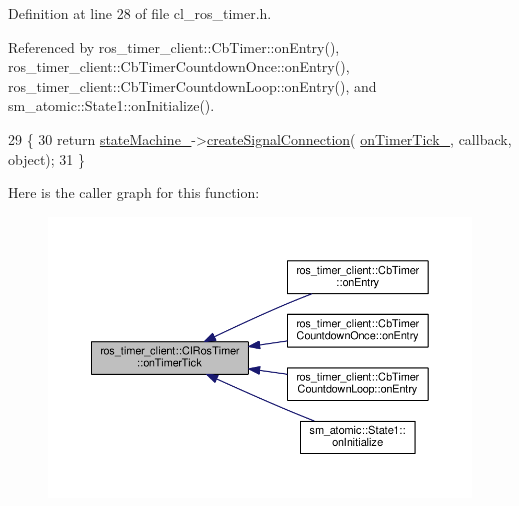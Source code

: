 Definition at line 28 of file cl\+\_\+ros\+\_\+timer.\+h.



Referenced by ros\+\_\+timer\+\_\+client\+::\+Cb\+Timer\+::on\+Entry(), ros\+\_\+timer\+\_\+client\+::\+Cb\+Timer\+Countdown\+Once\+::on\+Entry(), ros\+\_\+timer\+\_\+client\+::\+Cb\+Timer\+Countdown\+Loop\+::on\+Entry(), and sm\+\_\+atomic\+::\+State1\+::on\+Initialize().


\begin{DoxyCode}
29     \{
30         \textcolor{keywordflow}{return} \hyperlink{classsmacc_1_1ISmaccClient_a926e4f2ae796def63d48dca389a48c47}{stateMachine\_}->\hyperlink{classsmacc_1_1ISmaccStateMachine_adf0f42ade0c65cc471960fe2a7c42da2}{createSignalConnection}(
      \hyperlink{classros__timer__client_1_1ClRosTimer_a8c7a2ee6e8e8512b3f997e5560c0dc18}{onTimerTick\_}, callback, \textcolor{keywordtype}{object});
31     \}
\end{DoxyCode}


Here is the caller graph for this function\+:\nopagebreak
\begin{figure}[H]
\begin{center}
\leavevmode
\includegraphics[width=350pt]{classros__timer__client_1_1ClRosTimer_a06ecf6427b5df59f29879ab3bd1f120c_icgraph}
\end{center}
\end{figure}


